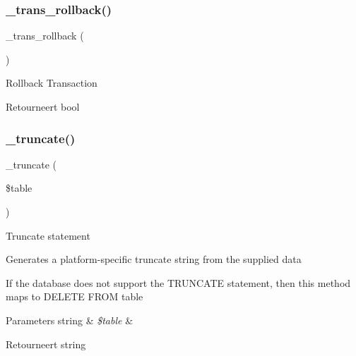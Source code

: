 \subsubsection{\texorpdfstring{\_trans\_rollback()}{\_trans\_rollback()}}
{\footnotesize\ttfamily \+\_\+trans\+\_\+rollback (\begin{DoxyParamCaption}{ }\end{DoxyParamCaption})\hspace{0.3cm}{\ttfamily [protected]}}

Rollback Transaction

\begin{DoxyReturn}{Retourneert}
bool 
\end{DoxyReturn}
\mbox{\label{class_c_i___d_b__sqlsrv__driver_aa029600528fc1ce660a23ff4b4667f95}} 
\subsubsection{\texorpdfstring{\_truncate()}{\_truncate()}}
{\footnotesize\ttfamily \+\_\+truncate (\begin{DoxyParamCaption}\item[{}]{\$table }\end{DoxyParamCaption})\hspace{0.3cm}{\ttfamily [protected]}}

Truncate statement

Generates a platform-\/specific truncate string from the supplied data

If the database does not support the T\+R\+U\+N\+C\+A\+TE statement, then this method maps to \textquotesingle{}D\+E\+L\+E\+TE F\+R\+OM table\textquotesingle{}


\begin{DoxyParams}[1]{Parameters}
string & {\em \$table} & \\
\hline
\end{DoxyParams}
\begin{DoxyReturn}{Retourneert}
string 
\end{DoxyReturn}
\mbox{\label{class_c_i___d_b__sqlsrv__driver_a2540b03a93fa73ae74c10d0e16fc073e}} 
